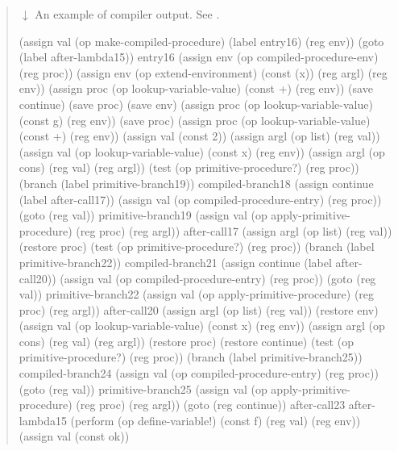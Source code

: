 \begin{quote}
 \( \downarrow \) An example of compiler output.  See
.

\begin{smallscheme}
(assign val
        (op make-compiled-procedure)
        (label entry16)
        (reg env))
  (goto (label after-lambda15))
entry16
  (assign env (op compiled-procedure-env) (reg proc))
  (assign env
          (op extend-environment)
          (const (x))
          (reg argl)
          (reg env))
  (assign proc
          (op lookup-variable-value)
          (const +)
          (reg env))
  (save continue)
  (save proc)
  (save env)
  (assign proc
          (op lookup-variable-value)
          (const g)
          (reg env))
  (save proc)
  (assign proc
          (op lookup-variable-value)
          (const +)
          (reg env))
  (assign val (const 2))
  (assign argl (op list) (reg val))
  (assign val
          (op lookup-variable-value)
          (const x)
          (reg env))
  (assign argl (op cons) (reg val) (reg argl))
  (test (op primitive-procedure?) (reg proc))
  (branch (label primitive-branch19))
compiled-branch18
  (assign continue (label after-call17))
  (assign val (op compiled-procedure-entry) (reg proc))
  (goto (reg val))
primitive-branch19
  (assign val
          (op apply-primitive-procedure)
          (reg proc)
          (reg argl))
after-call17
  (assign argl (op list) (reg val))
  (restore proc)
  (test (op primitive-procedure?) (reg proc))
  (branch (label primitive-branch22))
compiled-branch21
  (assign continue (label after-call20))
  (assign val (op compiled-procedure-entry) (reg proc))
  (goto (reg val))
primitive-branch22
  (assign val
          (op apply-primitive-procedure)
          (reg proc)
          (reg argl))
after-call20
  (assign argl (op list) (reg val))
  (restore env)
  (assign val
          (op lookup-variable-value)
          (const x)
          (reg env))
  (assign argl (op cons) (reg val) (reg argl))
  (restore proc)
  (restore continue)
  (test (op primitive-procedure?) (reg proc))
  (branch (label primitive-branch25))
compiled-branch24
  (assign val
          (op compiled-procedure-entry)
          (reg proc))
  (goto (reg val))
primitive-branch25
  (assign val
          (op apply-primitive-procedure)
          (reg proc)
          (reg argl))
  (goto (reg continue))
after-call23
after-lambda15
  (perform (op define-variable!)
           (const f)
           (reg val)
           (reg env))
  (assign val (const ok))
\end{smallscheme}

\end{quote}

